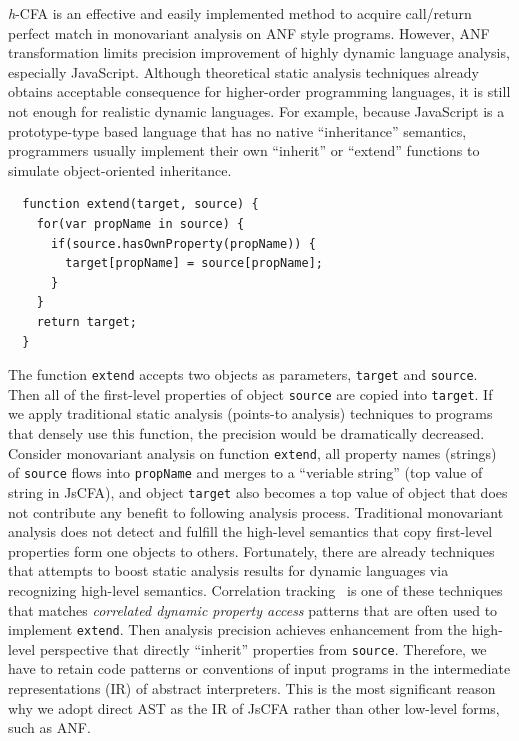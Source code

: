 \documentclass{article}
\begin{document}
\textit{h}-CFA is an effective and easily implemented method to acquire call/return perfect match in monovariant analysis on ANF style programs. However, ANF transformation limits precision improvement of highly dynamic language analysis, especially JavaScript.
Although theoretical static analysis techniques already obtains acceptable consequence for higher-order programming languages, it is still not enough for realistic dynamic languages. For example, because JavaScript is a prototype-type based language that has no native ``inheritance'' semantics, programmers usually implement their own ``inherit'' or ``extend'' functions to simulate object-oriented inheritance.
\begin{lstlisting}
  function extend(target, source) {
    for(var propName in source) {
      if(source.hasOwnProperty(propName)) {
        target[propName] = source[propName];
      }
    }
    return target;
  }
\end{lstlisting}
The function \verb|extend| accepts two objects as parameters, \verb|target| and \verb|source|.
Then all of the first-level properties of object \verb|source| are copied into \verb|target|. If we apply traditional static analysis (points-to analysis) techniques to programs that densely use this function, the precision would be dramatically decreased.
Consider monovariant analysis on function \verb|extend|, all property names (strings) of \verb|source| flows into \verb|propName| and merges to a ``veriable string'' (top value of string in JsCFA), and object \verb|target| also becomes a top value of object that does not contribute any benefit to following analysis process.
Traditional monovariant analysis does not detect and fulfill the high-level semantics that copy first-level properties form one objects to others.
Fortunately, there are already techniques that attempts to boost static analysis results for dynamic languages via recognizing high-level semantics.
Correlation tracking~\cite{sridharan2012correlation}
is one of these techniques that matches \emph{correlated dynamic property access} patterns that are often used to implement \verb|extend|. Then analysis precision achieves enhancement from the high-level perspective that directly ``inherit'' properties from \verb|source|.
Therefore, we have to retain code patterns or conventions of input programs in the intermediate representations (IR) of abstract interpreters.
This is the most significant reason why we adopt direct AST as the IR of JsCFA rather than other low-level forms, such as ANF\@.
\end{document}
